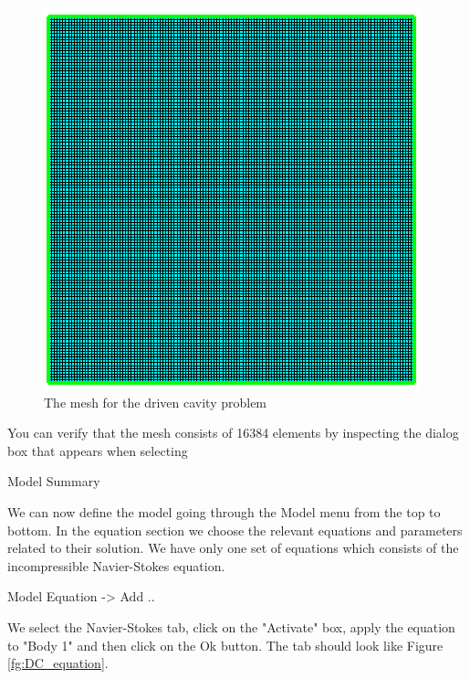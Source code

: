 \begin{figure}[H]
\centering
\includegraphics[scale=0.6]{DC_mesh}
\caption{The mesh for the driven cavity problem}\label{fg:DC_mesh}
\end{figure}

You can verify that the mesh consists of 16384 elements by inspecting the dialog box that appears when selecting

\ttbegin
Model
  Summary
\ttend

We can now define the model going through the Model menu from the top to bottom.  
In the equation section we choose the relevant equations and parameters related to their solution. 
We have only one set of equations which consists of the incompressible Navier-Stokes equation.

\ttbegin
Model
  Equation -> Add ..
\ttend  

We select the Navier-Stokes tab, click on the "Activate" box, apply the equation to "Body 1" and then click on the Ok button. The tab should look like Figure \ref{fg:DC_equation}. 

